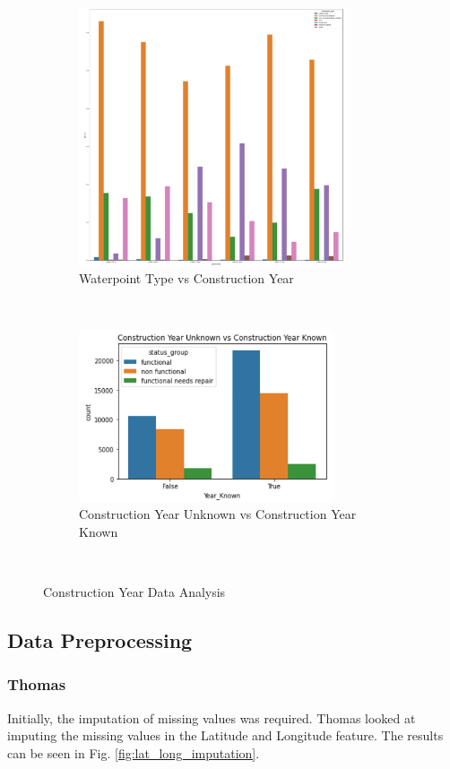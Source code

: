 \documentclass[conference]{IEEEtran}
\begin{document}
\begin{figure}[t!]
    \centering
    \begin{subfigure}[t]{0.5\textwidth}
      \centering
      \includegraphics[height=3in]{figures/tom_da_construction_year_1}
      \caption{Waterpoint Type vs Construction Year}
    \end{subfigure}%
    ~
    \begin{subfigure}[t]{0.5\textwidth}
      \centering
      \includegraphics[height=2in]{figures/tom_unknown_cy.png}
      \caption{Construction Year Unknown vs Construction Year Known}
    \end{subfigure}
    ~
    \caption{Construction Year Data Analysis}
    \label{fig:construction_year}
\end{figure}


    
\subsection{Data Preprocessing}

\subsubsection{Thomas}

Initially, the imputation of missing values was required. Thomas looked at imputing the missing values in the Latitude and Longitude feature. The results can be seen in Fig. \ref{fig:lat_long_imputation}.
\end{document}
